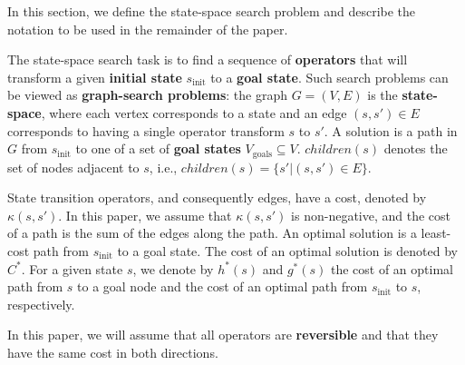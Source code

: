 \documentclass{article}
\begin{document}
In this section, we define the state-space search problem and describe the notation to be used in the remainder of the paper.

The state-space search task is to find a sequence of \textbf{operators} that will transform  a given \textbf{initial state} $s_{\mathrm{init}}$ to a \textbf{goal state}. Such search problems can be viewed as \textbf{graph-search problems}: the graph $G = (V, E)$ is the \textbf{state-space}, where each vertex corresponds to a state and an edge $(s,s')\in E$ corresponds to having a single operator transform $s$ to $s'$. 
A solution is a path in $G$ from $s_{\mathrm{init}}$ to one of a set of \textbf{goal states} $V_{\mathrm{goals}}\subseteq V$. $children(s)$ denotes the set of nodes adjacent to $s$, i.e., $children(s) = \{ s' | (s,s') \in E\}$.  %

State transition operators, and consequently edges, have a cost, denoted by $\kappa(s, s')$. In this paper, we assume that $\kappa(s, s')$ is non-negative, and the cost of a path is the sum of the edges along the path. An optimal solution is a least-cost path from $s_{\mathrm{init}}$ to a goal state. The cost of an optimal solution is denoted by $C^*$. For a given state $s$, we denote by $h^*(s)$ and $g^*(s)$ the cost of an optimal path from $s$ to a goal node and the cost of an optimal path from $s_{\mathrm{init}}$ to $s$, respectively. %

In this paper, we will assume that all operators are \textbf{reversible} and that they have the same cost in both directions.


\end{document}
